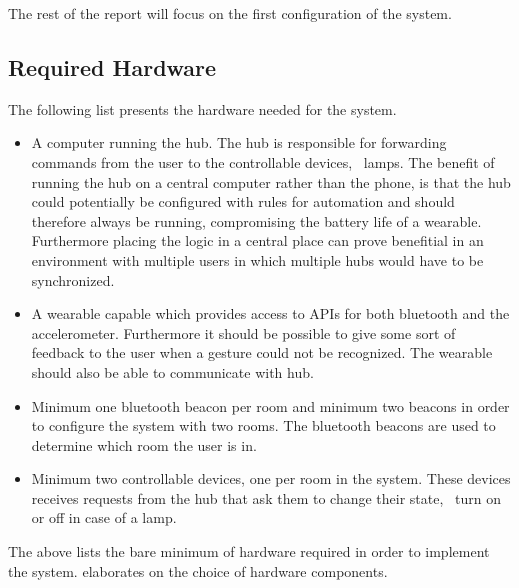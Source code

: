 
The rest of the report will focus on the first configuration of the system.

\subsection{Required Hardware}
\label{sec:analysis:system-components:required-hardware}

The following list presents the hardware needed for the system.

\begin{itemize}
\item A computer running the hub. The hub is responsible for forwarding commands from the user to the controllable devices, \eg~lamps. The benefit of running the hub on a central computer rather than the phone, is that the hub could potentially be configured with rules for automation and should therefore always be running, compromising the battery life of a wearable. Furthermore placing the logic in a central place can prove benefitial in an environment with multiple users in which multiple hubs would have to be synchronized.
\item A wearable capable which provides access to APIs for both bluetooth and the accelerometer. Furthermore it should be possible to give some sort of feedback to the user when a gesture could not be recognized. The wearable should also be able to communicate with hub.
\item Minimum one bluetooth beacon per room and minimum two beacons in order to configure the system with two rooms. The bluetooth beacons are used to determine which room the user is in.
\item Minimum two controllable devices, one per room in the system. These devices receives requests from the hub that ask them to change their state, \eg~turn on or off in case of a lamp.
\end{itemize}

The above lists the bare minimum of hardware required in order to implement the system.  elaborates on the choice of hardware components.

